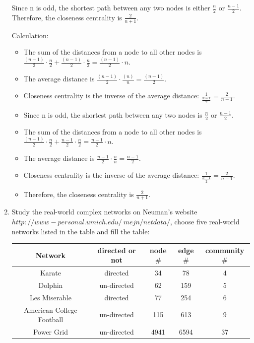 \documentclass{amsart}
\theoremstyle{definition}
\theoremstyle{remark}
\numberwithin{equation}{section}
\begin{document}
\begin{enumerate}
Since n is odd, the shortest path between any two nodes is either $\frac{n}{2}$ or $\frac{n-1}{2}$. Therefore, the closeness centrality is $\frac{2}{n+1}$.

\vspace{0.2cm}

Calculation: \vspace{0.2cm}
\begin{itemize}
    \item The sum of the distances from a node to all other nodes is $\frac{(n-1)}{2} \cdot \frac{n}{2} + \frac{(n-1)}{2} \cdot \frac{n}{2} = \frac{(n-1)}{2} \cdot n$.
    \item The average distance is $\frac{(n-1)}{2} \cdot \frac{(n)}{n} = \frac{(n-1)}{2}$.
    \item Closeness centrality is the inverse of the average distance: $\frac{1}{\frac{n-1}{2}} = \frac{2}{n-1}$.
    \item Since n is odd, the shortest path between any two nodes is $\frac{n}{2}$ or $\frac{n-1}{2}$.
    \item The sum of the distances from a node to all other nodes is $\frac{(n-1)}{2} \cdot \frac{n}{2} + \frac{n-1}{2} \cdot \frac{n}{2} = \frac{n-1}{2} \cdot n$.
    \item The average distance is $\frac{n-1}{2} \cdot \frac{n}{n} = \frac{n-1}{2}$.
    \item Closeness centrality is the inverse of the average distance: $\frac{1}{\frac{n-1}{2}} = \frac{2}{n-1}$.
    \item Therefore, the closeness centrality is $\frac{2}{n+1}$.
\end{itemize}


\clearpage
\item Study the real-world complex networks on Neuman's website $http://www-personal.umich.edu/~mejn/netdata/$, choose five real-world networks listed in the table and fill the table:

\begin{center}
\begin{tabular}{|c|c|c|c|c|}\hline
Network                   & directed or not  & node$ \#$ & edge$ \#$ & community$ \# $ \\ \hline
Karate                    & directed         &    34     &    78     &        4        \\ \hline
Dolphin                   & un-directed      &    62     &    159    &        5        \\ \hline
Les Miserable             & directed         &    77     &    254    &        6        \\ \hline
American College Football & un-directed      &    115    &    613    &        9        \\ \hline
Power Grid                & un-directed      &    4941   &    6594   &        37       \\ \hline
\end{tabular}
\end{center}


\end{enumerate}
\end{document}
